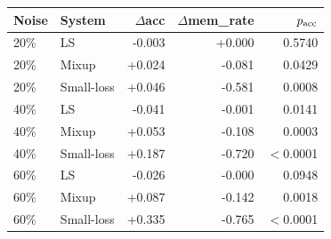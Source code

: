 \begin{tabular}{llrrr}
\toprule
Noise & System & $\Delta$acc & $\Delta$mem\_rate & $p_{\rm acc}$ \\
\midrule
20\% & LS & -0.003 & +0.000 & 0.5740 \\
20\% & Mixup & +0.024 & -0.081 & 0.0429 \\
20\% & Small-loss & +0.046 & -0.581 & 0.0008 \\
\midrule
40\% & LS & -0.041 & -0.001 & 0.0141 \\
40\% & Mixup & +0.053 & -0.108 & 0.0003 \\
40\% & Small-loss & +0.187 & -0.720 & $<$0.0001 \\
\midrule
60\% & LS & -0.026 & -0.000 & 0.0948 \\
60\% & Mixup & +0.087 & -0.142 & 0.0018 \\
60\% & Small-loss & +0.335 & -0.765 & $<$0.0001 \\
\bottomrule
\end{tabular}
